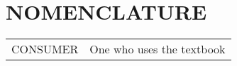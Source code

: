 %
%
%
%


\chapter*{NOMENCLATURE}

\vspace{-0.5in}
	\begin{table}[htbp]
	    \begin{tabular}{@{}p{} p{}@{}}
		CONSUMER		&	One who uses the textbook\\	[2ex] %
	    \end{tabular}%
	\end{table}

\pagebreak{}